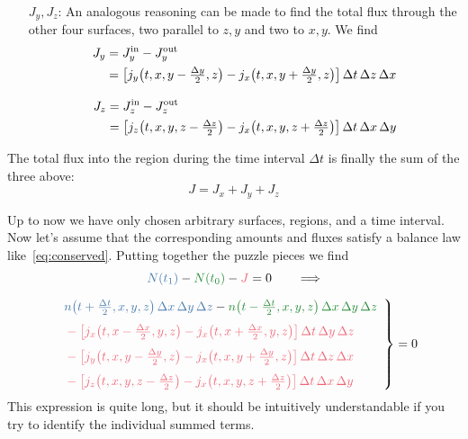 \documentclass[a4paper,12pt,%
onecolumn,oneside,titlepage,%
british%
]{memoir}
\newcommand*{\incr}{\Delta}%
\renewcommand*{\|}[1][]{\nonscript\:#1\vert\nonscript\:\mathopen{}}
\newcommand*{\yN}{N}
\newcommand*{\yJ}{J}
\newcommand*{\yti}{t_{0}}
\newcommand*{\ytf}{t_{1}}
\newcommand*{\Dt}{\incr t}
\newcommand*{\Dx}{\incr x}
\newcommand*{\Dy}{\incr y}
\newcommand*{\Dz}{\incr z}
\newcommand*{\Dth}{\tfrac{\incr t}{2}}
\newcommand*{\Dxh}{\tfrac{\incr x}{2}}
\newcommand*{\Dyh}{\tfrac{\incr y}{2}}
\newcommand*{\Dzh}{\tfrac{\incr z}{2}}
\begin{document}
\begin{itemize}
\begin{itemize}
  \item[$\yJ_{y}, \yJ_{z}$:] An analogous reasoning can be made to find the total flux through the other four surfaces, two parallel to $z,y$ and two to $x,y$. We find
    \begin{align}
      \label{neq:Fyflux}
      \begin{split}
        \yJ_{y} &= \yJ_{y}^{\text{in}} - \yJ_{y}^{\text{out}}
        \\&= \bigl[ j_{y}\bigl(t, x, y-\Dyh, z\bigr) - j_{x}\bigl(t, x, y+\Dyh, z\bigr)\bigr]
        \,\Dt\,\Dz\,\Dx
      \end{split}
      \\[3\jot]
      \label{neq:Fzflux}
      \begin{split}
        \yJ_{z} &= \yJ_{z}^{\text{in}} - \yJ_{z}^{\text{out}}
        \\&= \bigl[ j_{z}\bigl(t, x, y, z-\Dzh\bigr) - j_{x}\bigl(t, x, y, z+\Dzh\bigr)\bigr]
        \,\Dt\,\Dx\,\Dy
      \end{split}
    \end{align}
  \end{itemize}
The total flux into the region during the time interval $\Dt$ is finally the sum of the three above:
\begin{equation}
  \label{neq:Fflux}
  \yJ = \yJ_{x} + \yJ_{y} + \yJ_{z}
\end{equation}
\end{itemize}

Up to now we have only chosen arbitrary surfaces, regions, and a time interval. Now let's assume that the corresponding amounts and fluxes satisfy a balance law like~\eqref{eq:conserved}. Putting together the puzzle pieces we find
\begin{multline*}
  \label{neq:balance_pieces}
    \mathcolor{blue}{\yN(\ytf)} -\mathcolor{green}{\yN(\yti)} - \mathcolor{red}{\yJ} = 0 \qquad     \Longrightarrow
    \\[2\jot]
    \left.\begin{aligned}
      &\mathcolor{blue}{n\bigl(t+\Dth, x,y,z\bigr)\,\Dx\,\Dy\,\Dz}
      - \mathcolor{green}{n\bigl(t-\Dth, x,y,z\bigr)\,\Dx\,\Dy\,\Dz}
      \\[\jot]\quad&\color{red}-\bigl[ j_{x}\bigl(t, x-\Dxh, y, z\bigr) - j_{x}\bigl(t, x+\Dxh, y, z\bigr)\bigr]
      \,\Dt\,\Dy\,\Dz
      \\[\jot]\quad&\color{red}-\bigl[ j_{y}\bigl(t, x, y-\Dyh, z\bigr) - j_{x}\bigl(t, x, y+\Dyh, z\bigr)\bigr]
      \,\Dt\,\Dz\,\Dx
      \\[\jot]\quad&\color{red}-\bigl[ j_{z}\bigl(t, x, y, z-\Dzh\bigr) - j_{x}\bigl(t, x, y, z+\Dzh\bigr)\bigr]
      \,\Dt\,\Dx\,\Dy
    \end{aligned}\enspace\right\}=0
\end{multline*}
This expression is quite long, but it should be intuitively understandable if you try to identify the individual summed terms.
\end{document}
